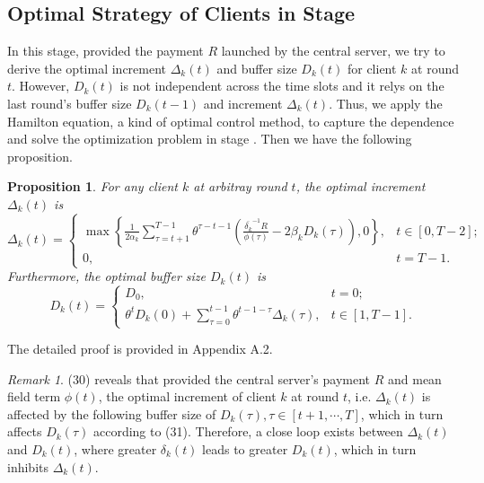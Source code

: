 \documentclass{article}
\theoremstyle{plain}
\newtheorem{proposition}[theorem]{Proposition}
\theoremstyle{definition}
\theoremstyle{remark}
\newtheorem{remark}[theorem]{Remark}
\begin{document}
\subsection{Optimal Strategy of Clients in Stage \uppercase\expandafter{}}
In this stage, provided the payment $R$ launched by the central server, we try to derive the optimal increment $\Delta_k(t)$ and buffer size $D_k(t)$ for client $k$ at round $t$.
However, $D_k(t)$ is not independent across the time slots and it relys on the last round's buffer size $D_k(t-1)$ and increment $\Delta_k(t)$. 
Thus, we apply the Hamilton equation, a kind of optimal control method, to capture the dependence and solve the optimization problem in stage \uppercase\expandafter{}. Then we have the following proposition.
\begin{proposition}
  For any client $k$ at arbitray round $t$, the optimal increment $\Delta_k(t)$ is
  \begin{equation}
    \Delta_k(t) = 
    \begin{cases}
      \max\left\{\frac{1}{2 \alpha_k} \sum_{\tau = t + 1}^{T - 1} \theta^{\tau - t - 1} \left(\frac{\overline{\delta_k}^{-1}R}{\phi(\tau)} - 2\beta_k D_k(\tau)\right), 0\right\}, & t \in [0, T-2]; \\
      \displaystyle 0, & t = T-1.
    \end{cases}
  \end{equation}
  Furthermore, the optimal buffer size $D_k(t)$ is
  \begin{equation}
    D_k(t) = 
    \begin{cases}
      \displaystyle D_0, & t = 0; \\
      \theta^{t} D_k(0) + \sum_{\tau = 0}^{t-1} \theta^{t-1-\tau} \Delta_k(\tau), & t \in [1, T-1].
    \end{cases}
  \end{equation}
\end{proposition}
The detailed proof is provided in Appendix A.2.
\begin{remark}
  (30) reveals that provided the central server's payment $R$ and mean field term $\phi(t)$, the optimal increment of client $k$ at round $t$, i.e. $\Delta_k(t)$ is affected by the following buffer size of $D_k(\tau), \tau \in [t+1, \cdots, T]$, which in turn affects $D_k(\tau)$ according to (31).
  Therefore, a close loop exists between $\Delta_k(t)$ and $D_k(t)$, where greater $\delta_k(t)$ leads to greater $D_k(t)$, which in turn inhibits $\Delta_k(t)$.
\end{remark}
\end{document}
